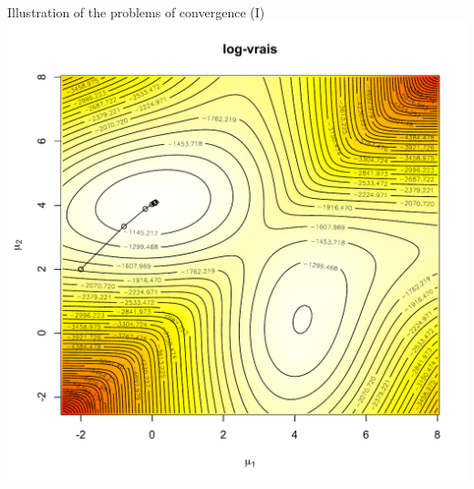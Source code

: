 \documentclass[compress,10pt]{beamer}
\begin{document}
\begin{frame}{Illustration of the problems of convergence (I)}
\centering
\includegraphics[width = 0.7 \textwidth]{figure-data_sim-logvrais-init1}
\end{frame}
\end{document}
